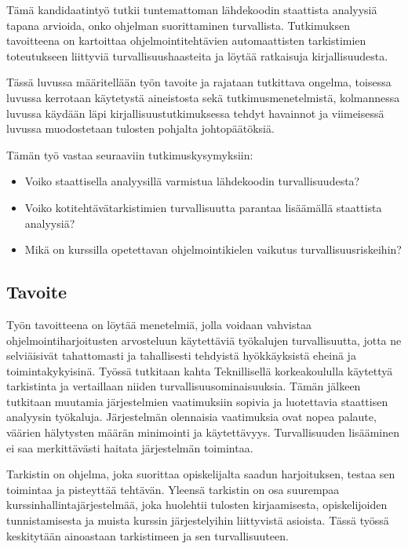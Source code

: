 Tämä kandidaatintyö tutkii tuntemattoman lähdekoodin staattista
analyysiä tapana arvioida, onko ohjelman suorittaminen turvallista.
Tutkimuksen tavoitteena on kartoittaa ohjelmointitehtävien automaattisten
tarkistimien toteutukseen liittyviä turvallisuushaasteita ja löytää
ratkaisuja kirjallisuudesta.

Tässä luvussa määritellään työn tavoite ja rajataan tutkittava ongelma,
toisessa luvussa kerrotaan käytetystä aineistosta sekä tutkimusmenetelmistä,
kolmannessa luvussa käydään läpi kirjallisuustutkimuksessa tehdyt havainnot
ja viimeisessä luvussa muodostetaan tulosten pohjalta johtopäätöksiä.

Tämän työ vastaa seuraaviin tutkimuskysymyksiin:

\begin{itemize}
\item Voiko staattisella analyysillä varmistua lähdekoodin turvallisuudesta?
\item Voiko kotitehtävätarkistimien turvallisuutta parantaa lisäämällä
staattista analyysiä?
\item Mikä on kurssilla opetettavan ohjelmointikielen vaikutus
turvallisuusriskeihin?
\end{itemize}

\subsection{Tavoite}

Työn tavoitteena on löytää menetelmiä, jolla voidaan vahvistaa
ohjelmointiharjoitusten arvosteluun käytettäviä työkalujen turvallisuutta,
jotta ne selviäisivät tahattomasti ja tahallisesti tehdyistä hyökkäyksistä
eheinä ja toimintakykyisinä. Työssä tutkitaan kahta Teknillisellä korkeakoululla
käytettyä tarkistinta ja vertaillaan niiden turvallisuusominaisuuksia.
Tämän jälkeen tutkitaan muutamia järjestelmien vaatimuksiin sopivia ja
luotettavia staattisen analyysin työkaluja. Järjestelmän olennaisia vaatimuksia
ovat nopea palaute, väärien hälytysten määrän minimointi ja käytettävyys.
Turvallisuuden lisääminen ei saa merkittävästi haitata järjestelmän toimintaa.

Tarkistin on ohjelma, joka suorittaa opiskelijalta saadun harjoituksen,
testaa sen toimintaa ja pisteyttää tehtävän. Yleensä tarkistin on osa suurempaa
kurssinhallintajärjestelmää, joka huolehtii tulosten kirjaamisesta,
opiskelijoiden tunnistamisesta ja muista kurssin järjestelyihin liittyvistä
asioista. Tässä työssä keskitytään ainoastaan tarkistimeen ja sen
turvallisuuteen.

